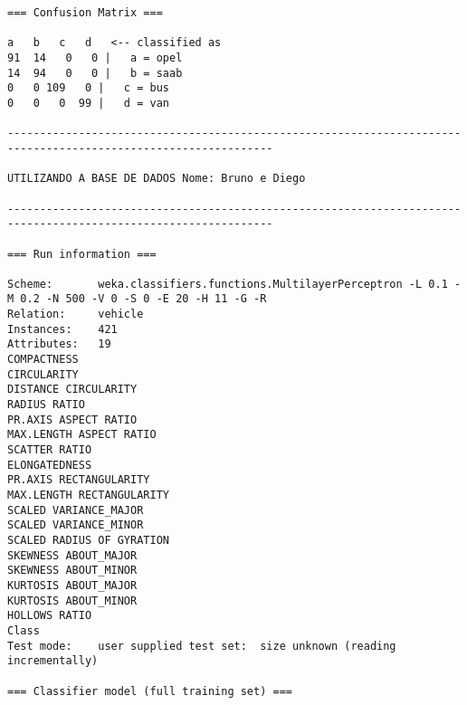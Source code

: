 \documentclass[
	article,			%
	11pt,				%
	oneside,			%
	a4paper,			%
	english,			%
	brazil,				%
	sumario=tradicional
	]{abntex2}
\begin{document}
\begin{lstlisting}
=== Confusion Matrix ===

a   b   c   d   <-- classified as
91  14   0   0 |   a = opel
14  94   0   0 |   b = saab
0   0 109   0 |   c = bus
0   0   0  99 |   d = van

---------------------------------------------------------------------------------------------------------------

UTILIZANDO A BASE DE DADOS Nome: Bruno e Diego

---------------------------------------------------------------------------------------------------------------

=== Run information ===

Scheme:       weka.classifiers.functions.MultilayerPerceptron -L 0.1 -M 0.2 -N 500 -V 0 -S 0 -E 20 -H 11 -G -R
Relation:     vehicle
Instances:    421
Attributes:   19
COMPACTNESS
CIRCULARITY
DISTANCE CIRCULARITY
RADIUS RATIO
PR.AXIS ASPECT RATIO
MAX.LENGTH ASPECT RATIO
SCATTER RATIO
ELONGATEDNESS
PR.AXIS RECTANGULARITY
MAX.LENGTH RECTANGULARITY
SCALED VARIANCE_MAJOR
SCALED VARIANCE_MINOR
SCALED RADIUS OF GYRATION
SKEWNESS ABOUT_MAJOR
SKEWNESS ABOUT_MINOR
KURTOSIS ABOUT_MAJOR
KURTOSIS ABOUT_MINOR
HOLLOWS RATIO
Class
Test mode:    user supplied test set:  size unknown (reading incrementally)

=== Classifier model (full training set) ===


\end{lstlisting}
\end{document}
